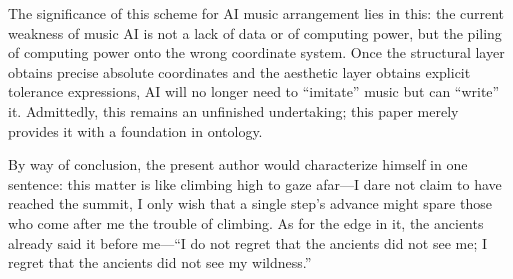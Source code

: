 \documentclass[11pt,a4paper]{article}
\begin{document}
The significance of this scheme for AI music arrangement lies in this: the current weakness
of music AI is not a lack of data or of computing power, but the piling of computing power
onto the wrong coordinate system. Once the structural layer obtains precise absolute
coordinates and the aesthetic layer obtains explicit tolerance expressions, AI will no
longer need to ``imitate'' music but can ``write'' it. Admittedly, this remains an
unfinished undertaking; this paper merely provides it with a foundation in ontology.

By way of conclusion, the present author would characterize himself in one sentence: this
matter is like climbing high to gaze afar---I dare not claim to have reached the summit, I
only wish that a single step's advance might spare those who come after me the trouble of
climbing. As for the edge in it, the ancients already said it before me---``I do not regret
that the ancients did not see me; I regret that the ancients did not see my wildness.''
\end{document}
